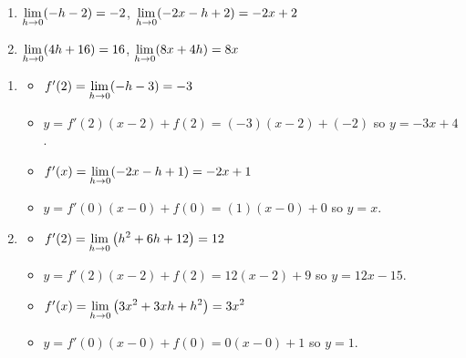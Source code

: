\begin{enumerate}
\setcounter{enumi}{\value{HW}}

\item    $\displaystyle{\lim_{h \rightarrow 0} (-h-2) = -2}$,   $\displaystyle{\lim_{h \rightarrow 0} (-2x-h+2) = -2x+2}$   
\item   $\displaystyle{\lim_{h \rightarrow 0} (4h+16) = 16}$,   $\displaystyle{\lim_{h \rightarrow 0} (8x+4h) = 8x}$ 

\setcounter{HW}{\value{enumi}}
\end{enumerate}

\begin{enumerate}
\setcounter{enumi}{\value{HW}}

\item \begin{itemize}  \item $f'(2) = \displaystyle{\lim_{h \rightarrow 0} (-h-3) = -3}$

\smallskip

\item  $y = f'(2)(x-2) + f(2) = (-3)(x-2)+(-2)$ so $y  = -3x+4$.

\smallskip

\item   $f'(x) =  \displaystyle{\lim_{h \rightarrow 0} (-2x-h+1) = -2x+1}$ 

\smallskip

\item  $y = f'(0)(x-0) + f(0) = (1)(x-0) + 0$ so $y = x$.

\smallskip

\end{itemize}

\item \begin{itemize}

\item $f'(2) = \displaystyle{\lim_{h \rightarrow 0} \left( h^2+6h+12 \right) = 12}$

\smallskip

\item  $y = f'(2)(x-2) + f(2) = 12(x-2)+ 9$ so $y = 12x - 15$.

\smallskip

\item  $f'(x) = \displaystyle{\lim_{h \rightarrow 0} \left(3x^{2} + 3xh + h^{2} \right) = 3x^{2}}$ 

\smallskip

\item $y = f'(0)(x-0)+f(0) = 0(x-0)+1$ so $y = 1$.

\smallskip

\end{itemize} 

\setcounter{HW}{\value{enumi}}
\end{enumerate}

